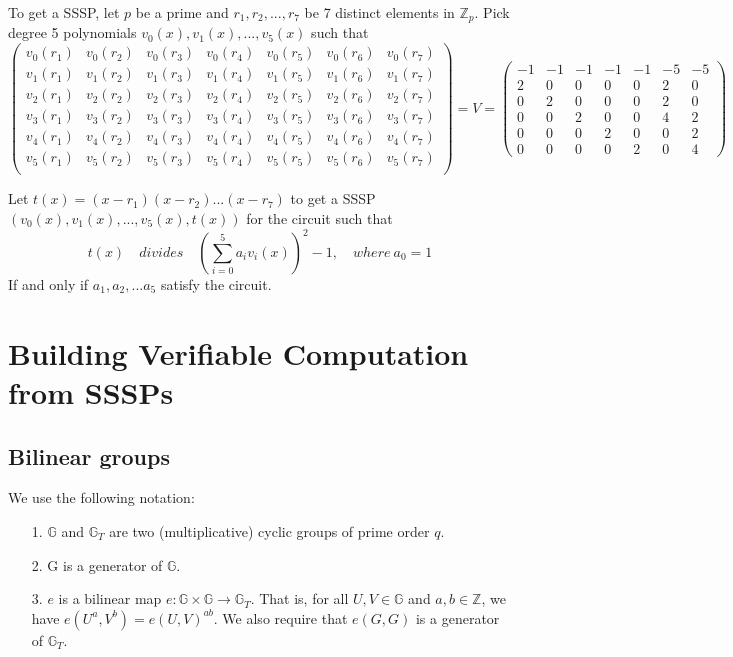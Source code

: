 \documentclass[lnbip]{svmultln}
\begin{document}
To get a SSSP, let $p$ be a prime and $r_1,r_2,...,r_7$ be 7 distinct elements in $\mathbb{Z}_p$. Pick degree 5 polynomials $v_0(x),v_1(x),...,v_5(x)$ such that
$$
\begin{pmatrix} 
v_0(r_1) & v_0(r_2) & v_0(r_3) & v_0(r_4) & v_0(r_5) & v_0(r_6) & v_0(r_7) \\
v_1(r_1) & v_1(r_2) & v_1(r_3) & v_1(r_4) & v_1(r_5) & v_1(r_6) & v_1(r_7) \\
v_2(r_1) & v_2(r_2) & v_2(r_3) & v_2(r_4) & v_2(r_5) & v_2(r_6) & v_2(r_7) \\
v_3(r_1) & v_3(r_2) & v_3(r_3) & v_3(r_4) & v_3(r_5) & v_3(r_6) & v_3(r_7) \\
v_4(r_1) & v_4(r_2) & v_4(r_3) & v_4(r_4) & v_4(r_5) & v_4(r_6) & v_4(r_7) \\
v_5(r_1) & v_5(r_2) & v_5(r_3) & v_5(r_4) & v_5(r_5) & v_5(r_6) & v_5(r_7) \\
\end{pmatrix}
= V =
\begin{pmatrix} 
-1 & -1 & -1 & -1 & -1 & -5 & -5 \\
2 & 0 & 0 & 0 & 0 & 2 & 0 \\
0 & 2 & 0 & 0 & 0 & 2 & 0 \\
0 & 0 & 2 & 0 & 0 & 4 & 2 \\
0 & 0 & 0 & 2 & 0 & 0 & 2 \\
0 & 0 & 0 & 0 & 2 & 0 & 4 
\end{pmatrix}
$$

Let $t(x)=(x-r_1)(x-r_2)...(x-r_7)$ to get a SSSP $(v_0(x),v_1(x),...,v_5(x),t(x))$ for the circuit such that
$$t(x)\quad divides\quad \left(\sum\limits_{i=0}^5a_i v_i(x)\right)^2-1, \quad where ~ a_0=1$$
If and only if $a_1,a_2,...a_5$ satisfy the circuit.


\section{Building Verifiable Computation from SSSPs}


\subsection{Bilinear groups}
We use the following notation\cite{boneh2005evaluating}:
\begin{itemize}
	\item[1.] $\mathbb{G}$ and $\mathbb{G}_T$ are two (multiplicative) cyclic groups of prime order $q$.
	\item[2.] G is a generator of $\mathbb{G}$.
	\item[3.] $e$ is a bilinear map $e:\mathbb{G} \times \mathbb{G} \rightarrow \mathbb{G}_T$. That is, for all $U,V \in \mathbb{G}$ and $a,b \in \mathbb{Z}$, we have $e(U^a,V^b)=e(U,V)^{ab}.$ We also require that $e(G,G)$ is a generator of $\mathbb{G}_T$.
\end{itemize}
\end{document}
